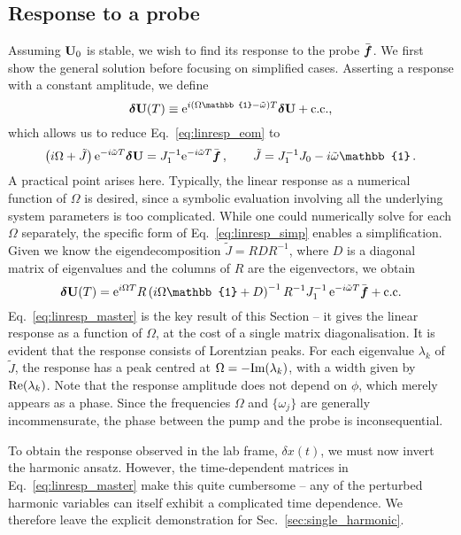 \subsection{Response to a probe} \label{sec:linresp_response1}
Assuming $\vb{U}_0$ is stable, we wish to find its response to the probe $\bar{\boldsymbol{f}}$. We first show the general solution before focusing on simplified cases. Asserting a response with a constant amplitude, we define
\begin{equation} \label{eq:linresp_steady_resp}
\bdel{U}(T) \equiv  \e^{i(\Omega \mathbb{1}- \tilde{\omega}) T} \bdel{U} + \text{c.c.,} 
\end{equation}
which allows us to reduce Eq.~\eqref{eq:linresp_eom} to
\begin{equation} \label{eq:linresp_simp}
\left( i \Omega + \tilde{J}\right) \e^{-i \tilde{\omega}T} \bdel{U} = J_1^{-1} \e^{-i \tilde{\omega} T} \bbar{f} \,, \qquad \tilde{J} = J_1^{-1} J_0 - i \tilde{\omega} \mathbb{1}\,.
\end{equation}
A practical point arises here. Typically, the linear response as a numerical function of $\Omega$ is desired, since a symbolic evaluation involving all the underlying system parameters is too complicated. While one could numerically solve for each $\Omega$ separately, the specific form of Eq.~\eqref{eq:linresp_simp} enables a simplification. Given we know the eigendecomposition $\tilde{J} = R D R^{-1}$, where $D$ is a diagonal matrix of eigenvalues and the columns of $R$ are the eigenvectors, we obtain 
\begin{equation} \label{eq:linresp_master}
\bdel{U}(T) = \e^{i \Omega T} R \left( i \Omega \mathbb{1} + D \right)^{-1} R^{-1} J_1^{-1} \,\e^{-i \tilde{\omega} T} \bbar{f} + \text{c.c.}
\end{equation}
Eq.~\eqref{eq:linresp_master} is the key result of this Section -- it gives the linear response as a function of $\Omega$, at the cost of a single matrix diagonalisation. It is evident that the response consists of Lorentzian peaks. For each eigenvalue $\lambda_k$ of $\tilde{J}$, the response has a peak centred at $\Omega = -\text{Im} (\lambda_k)$, with a width given by $\text{Re} (\lambda_k)$. Note that the response amplitude does not depend on $\phi$, which merely appears as a phase. Since the frequencies $\Omega$ and $\{\omega_j\}$ are generally incommensurate, the phase between the pump and the probe is inconsequential.

To obtain the response observed in the lab frame, $\delta x(t)$, we must now invert the harmonic ansatz. However, the time-dependent matrices in Eq.~\eqref{eq:linresp_master} make this quite cumbersome -- any of the perturbed harmonic variables can itself exhibit a complicated time dependence. We therefore leave the explicit demonstration for Sec.~\ref{sec:single_harmonic}.

